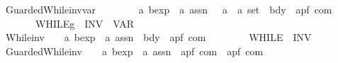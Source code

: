 \begin{isabellebody}
\isanewline
\ \ {\isachardoublequoteopen}{\isacharunderscore}GuardedWhile{\isacharunderscore}inv{\isacharunderscore}var{\isachardoublequoteclose}{\isacharcolon}{\isacharcolon}\ \isanewline
\ \ \ \ \ \ \ {\isachardoublequoteopen}{\isacharprime}a\ bexp\ {\isacharequal}{\isachargreater}\ {\isacharprime}a\ assn\ \ {\isasymRightarrow}\ {\isacharparenleft}{\isacharprime}a\ {\isasymtimes}\ {\isacharprime}a{\isacharparenright}\ set\ {\isasymRightarrow}\ bdy\ {\isasymRightarrow}\ {\isacharparenleft}{\isacharprime}a{\isacharcomma}{\isacharprime}p{\isacharcomma}{\isacharprime}f{\isacharparenright}\ com{\isachardoublequoteclose}\isanewline
\ \ \ \ \ \ \ \ {\isacharparenleft}{\isachardoublequoteopen}{\isacharparenleft}{}WHILE\isactrlsub g\ {\isacharparenleft}{\isacharunderscore}{\isacharparenright}{\isacharslash}\ INV\ {\isacharparenleft}{\isacharunderscore}{\isacharparenright}{\isacharslash}\ VAR\ {\isacharparenleft}{\isacharunderscore}{\isacharparenright}\ {\isacharslash}{\isacharunderscore}{\isacharparenright}{\isachardoublequoteclose}\ \ {\isacharbrackleft}{}{}{\isacharcomma}\ {}{\isacharcomma}\ {}{\isacharcomma}\ {}{}{\isacharbrackright}\ {}{}{\isacharparenright}\isanewline
\ \ {\isachardoublequoteopen}{\isacharunderscore}While{\isacharunderscore}inv{\isachardoublequoteclose}\ \ \ {\isacharcolon}{\isacharcolon}\ {\isachardoublequoteopen}{\isacharprime}a\ bexp\ {\isacharequal}{\isachargreater}\ {\isacharprime}a\ assn\ {\isacharequal}{\isachargreater}\ bdy\ {\isacharequal}{\isachargreater}\ {\isacharparenleft}{\isacharprime}a{\isacharcomma}{\isacharprime}p{\isacharcomma}{\isacharprime}f{\isacharparenright}\ com{\isachardoublequoteclose}\isanewline
\ \ \ \ \ \ \ \ {\isacharparenleft}{\isachardoublequoteopen}{\isacharparenleft}{}WHILE\ {\isacharparenleft}{\isacharunderscore}{\isacharparenright}{\isacharslash}\ INV\ {\isacharparenleft}{\isacharunderscore}{\isacharparenright}\ {\isacharslash}{\isacharunderscore}{\isacharparenright}{\isachardoublequoteclose}\ \ {\isacharbrackleft}{}{}{\isacharcomma}\ {}{\isacharcomma}\ {}{}{\isacharbrackright}\ {}{}{\isacharparenright}\isanewline
\ \ {\isachardoublequoteopen}{\isacharunderscore}GuardedWhile{\isacharunderscore}inv{\isachardoublequoteclose}\ \ \ {\isacharcolon}{\isacharcolon}\ {\isachardoublequoteopen}{\isacharprime}a\ bexp\ {\isacharequal}{\isachargreater}\ {\isacharprime}a\ assn\ {\isacharequal}{\isachargreater}\ {\isacharparenleft}{\isacharprime}a{\isacharcomma}{\isacharprime}p{\isacharcomma}{\isacharprime}f{\isacharparenright}\ com\ {\isacharequal}{\isachargreater}\ {\isacharparenleft}{\isacharprime}a{\isacharcomma}{\isacharprime}p{\isacharcomma}{\isacharprime}f{\isacharparenright}\ com{\isachardoublequoteclose}\isanewline

\end{isabellebody}
